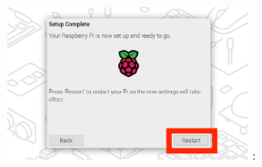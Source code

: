 \documentclass[a4paper,12pt]{jarticle}
\begin{document}
\begin{enumerate}
\begin{itemize}
                        \begin{figure}[h]
                          \centering
                          \begin{minipage}{5.228cm}
                            {\upshape
                              \includegraphics[width=7.000cm]{sw_image08.png}
                              \newline
                              {\theFigure\label{seq:refFigure19}}:
                               }
                          \end{minipage}
                        \end{figure}
                  \end{itemize}  
                
\clearpage     
\end{enumerate}
\end{document}
